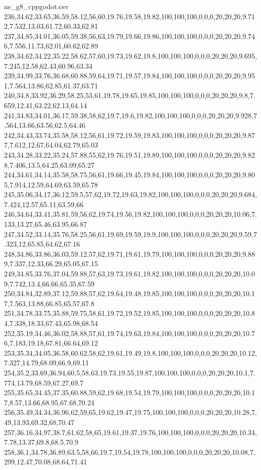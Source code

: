 \begin{filecontents*}[overwrite]{ns_g8_cppgodot.csv}
236,34.62,33.65,36.59,58.12,56,60,19.76,19.58,19.82,100,100,100,0,0,0,20,20,20,9.712,7.532,13.03,61.72,60.33,62.81
237,34.85,34.01,36.05,59.38,56,63,19.79,19.66,19.86,100,100,100,0,0,0,20,20,20,9.746,7.556,11.73,62.01,60.62,62.89
238,34.62,34.22,35.22,58.62,57,60,19.73,19.62,19.8,100,100,100,0,0,0,20,20,20,9.695,7.245,12.58,62.43,60.96,63.34
239,34.99,33.76,36.68,60.88,59,64,19.71,19.57,19.84,100,100,100,0,0,0,20,20,20,9.951,7.564,13.86,62.85,61.37,63.71
240,34.8,33.92,36.29,58.25,53,61,19.78,19.65,19.85,100,100,100,0,0,0,20,20,20,9.8,7.659,12.41,63.22,62.13,64.14
241,34.83,34.01,36.17,59.38,58,62,19.7,19.6,19.82,100,100,100,0,0,0,20,20,20,9.928,7.564,13.66,63.56,62.5,64.46
242,34.43,33.74,35.58,58.12,56,61,19.72,19.59,19.83,100,100,100,0,0,0,20,20,20,9.877,7.612,12.67,64.04,62.79,65.03
243,34.28,33.22,35.24,57.88,55,62,19.76,19.51,19.89,100,100,100,0,0,0,20,20,20,9.828,7.406,13.5,64.25,63.09,65.27
244,34.61,34.14,35.58,58.75,56,61,19.66,19.45,19.84,100,100,100,0,0,0,20,20,20,9.805,7.914,12.59,64.69,63.59,65.78
245,35.06,34.17,36.12,59.5,57,62,19.72,19.63,19.82,100,100,100,0,0,0,20,20,20,9.684,7.424,12.57,65.11,63.59,66
246,34.64,33.41,35.81,59,56,62,19.74,19.56,19.82,100,100,100,0,0,0,20,20,20,10.06,7.133,13.27,65.46,63.95,66.87
247,34.52,33.14,35.76,58.25,56,61,19.69,19.59,19.9,100,100,100,0,0,0,20,20,20,9.59,7.323,12,65.85,64.62,67.16
248,34.86,33.86,36.03,59.12,57,62,19.71,19.61,19.79,100,100,100,0,0,0,20,20,20,9.889,7.337,12.33,66.29,65.05,67.15
249,34.85,33.76,37.04,59.88,57,63,19.73,19.61,19.82,100,100,100,0,0,0,20,20,20,10.09,7.742,13.4,66.66,65.35,67.59
250,34.84,32.89,37.12,59.88,57,62,19.64,19.48,19.85,100,100,100,0,0,0,20,20,20,10.17,7.563,13.88,66.85,65.57,67.8
251,34.78,33.75,35.88,59.75,58,61,19.72,19.52,19.85,100,100,100,0,0,0,20,20,20,10.84,7.338,18.33,67.43,65.98,68.54
252,35.19,34.46,36.02,58.88,57,61,19.74,19.63,19.84,100,100,100,0,0,0,20,20,20,10.76,7.183,19.18,67.81,66.64,69.12
253,35.34,34.05,36.58,60.62,58,62,19.61,19.49,19.8,100,100,100,0,0,0,20,20,20,10.12,7.327,14.79,68.09,66.9,69.11
254,35.2,33.69,36.94,60.5,58,63,19.73,19.55,19.87,100,100,100,0,0,0,20,20,20,10.1,7.774,13.79,68.59,67.27,69.7
255,35.65,34.45,37.35,60.88,59,62,19.68,19.54,19.79,100,100,100,0,0,0,20,20,20,10.17,8.57,13.66,68.95,67.68,70.24
256,35.49,34.34,36.96,62,59,65,19.62,19.47,19.75,100,100,100,0,0,0,20,20,20,10.28,7.49,13.93,69.32,68,70.47
257,36.16,34.97,38.7,61.62,58,65,19.61,19.37,19.76,100,100,100,0,0,0,20,20,20,10.34,7.78,13.37,69.8,68.5,70.9
258,36.1,34.78,36.89,63.5,58,66,19.7,19.54,19.78,100,100,100,0,0,0,20,20,20,10.08,7.299,12.47,70.08,68.64,71.41

\end{filecontents*}
